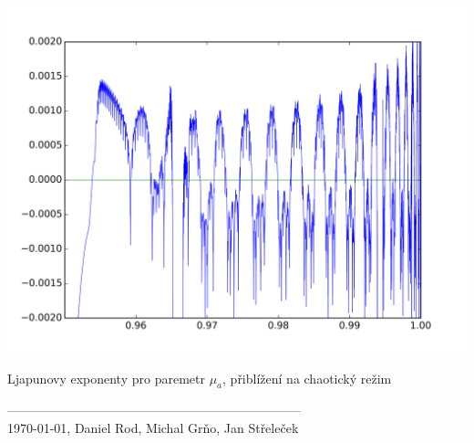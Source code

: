 \documentclass[a4paper, 12pt]{article}
\begin{document}
\begin{graph}[H]
	\centering
\includegraphics[width=\textwidth]{grafy/mua.png}
\vspace{-10pt}
\caption{Ljapunovy exponenty pro paremetr $\mu_a$, přiblížení na chaotický režim}
\label{fig:lyapunov_mua_zoom}
\end{graph}

---------------------------------------------------------------------\\
\today, Daniel Rod, Michal Grňo, Jan Střeleček
\end{document}

